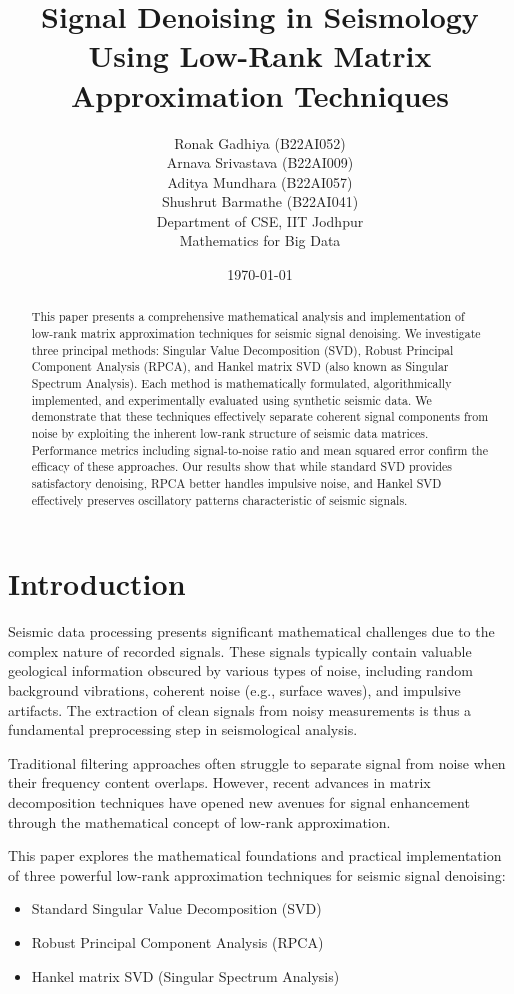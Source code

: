\documentclass[11pt]{article}
\title{\Large \textbf{Signal Denoising in Seismology Using Low-Rank Matrix Approximation Techniques}}
\author{Ronak Gadhiya (B22AI052) \\ 
        Arnava Srivastava (B22AI009) \\
        Aditya Mundhara (B22AI057) \\
        Shushrut Barmathe (B22AI041) \\
        Department of CSE, IIT Jodhpur \\
        Mathematics for Big Data}
\date{\today}
\begin{document}
\maketitle

\begin{abstract}
This paper presents a comprehensive mathematical analysis and implementation of low-rank matrix approximation techniques for seismic signal denoising. We investigate three principal methods: Singular Value Decomposition (SVD), Robust Principal Component Analysis (RPCA), and Hankel matrix SVD (also known as Singular Spectrum Analysis). Each method is mathematically formulated, algorithmically implemented, and experimentally evaluated using synthetic seismic data. We demonstrate that these techniques effectively separate coherent signal components from noise by exploiting the inherent low-rank structure of seismic data matrices. Performance metrics including signal-to-noise ratio and mean squared error confirm the efficacy of these approaches. Our results show that while standard SVD provides satisfactory denoising, RPCA better handles impulsive noise, and Hankel SVD effectively preserves oscillatory patterns characteristic of seismic signals.
\end{abstract}

\section{Introduction}
Seismic data processing presents significant mathematical challenges due to the complex nature of recorded signals. These signals typically contain valuable geological information obscured by various types of noise, including random background vibrations, coherent noise (e.g., surface waves), and impulsive artifacts. The extraction of clean signals from noisy measurements is thus a fundamental preprocessing step in seismological analysis.

Traditional filtering approaches often struggle to separate signal from noise when their frequency content overlaps. However, recent advances in matrix decomposition techniques have opened new avenues for signal enhancement through the mathematical concept of low-rank approximation.

This paper explores the mathematical foundations and practical implementation of three powerful low-rank approximation techniques for seismic signal denoising:

\begin{itemize}
\item Standard Singular Value Decomposition (SVD)
\item Robust Principal Component Analysis (RPCA)
\item Hankel matrix SVD (Singular Spectrum Analysis)
\end{itemize}
\end{document}
